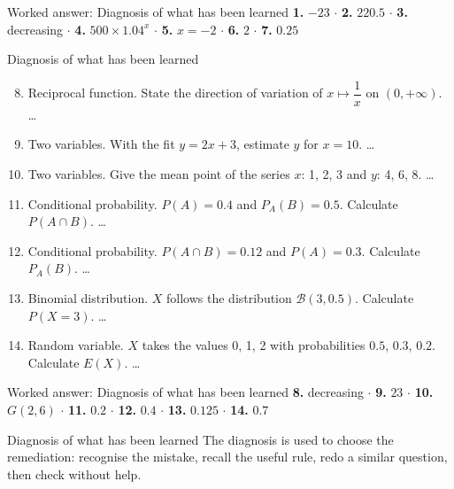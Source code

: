 \documentclass[aspectratio=169,10pt]{beamer}
\begin{document}
\begin{frame}{Worked answer: Diagnosis of what has been learned}
\textbf{1.} \(-23\) \ensuremath{\cdot} \textbf{2.} \(220.5\) \ensuremath{\cdot} \textbf{3.} decreasing \ensuremath{\cdot} \textbf{4.} \(500\times1.04^x\) \ensuremath{\cdot} \textbf{5.} \(x=-2\) \ensuremath{\cdot} \textbf{6.} \(2\) \ensuremath{\cdot} \textbf{7.} \(0.25\)
\end{frame}
\begin{frame}{Diagnosis of what has been learned}
\begin{enumerate}
\setcounter{enumi}{7}\item Reciprocal function. State the direction of variation of \(x\mapsto\dfrac1x\) on \((0,+\infty)\). \ldots{}

\item Two variables. With the fit \(y=2x+3\), estimate \(y\) for \(x=10\). \ldots{}

\item Two variables. Give the mean point of the series \(x\): 1, 2, 3 and \(y\): 4, 6, 8. \ldots{}

\item Conditional probability. \(P(A)=0.4\) and \(P_A(B)=0.5\). Calculate \(P(A\cap B)\). \ldots{}

\item Conditional probability. \(P(A\cap B)=0.12\) and \(P(A)=0.3\). Calculate \(P_A(B)\). \ldots{}

\item Binomial distribution. \(X\) follows the distribution \(\mathcal B(3,0.5)\). Calculate \(P(X=3)\). \ldots{}

\item Random variable. \(X\) takes the values 0, 1, 2 with probabilities \(0.5\), \(0.3\), \(0.2\). Calculate \(E(X)\). \ldots{}

\end{enumerate}
\end{frame}
\begin{frame}{Worked answer: Diagnosis of what has been learned}
\textbf{8.} decreasing \ensuremath{\cdot} \textbf{9.} \(23\) \ensuremath{\cdot} \textbf{10.} \(G(2,6)\) \ensuremath{\cdot} \textbf{11.} \(0.2\) \ensuremath{\cdot} \textbf{12.} \(0.4\) \ensuremath{\cdot} \textbf{13.} \(0.125\) \ensuremath{\cdot} \textbf{14.} \(0.7\)
\end{frame}
\begin{frame}{Diagnosis of what has been learned}
The diagnosis is used to choose the remediation: recognise the mistake, recall the useful rule, redo a similar question, then check without help.
\end{frame}
\end{document}

